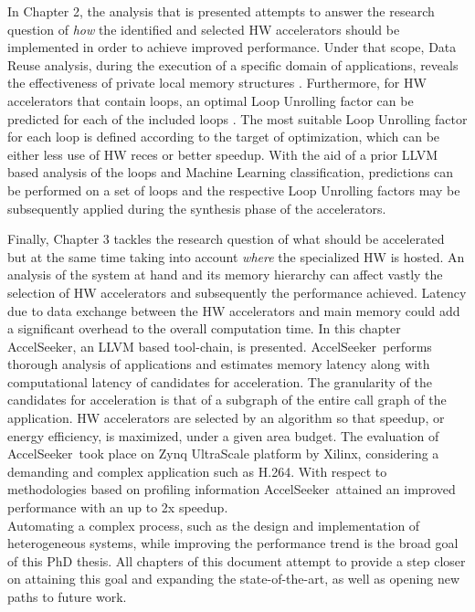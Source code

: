 \documentclass[]{usiinfthesis}
\newcommand{\aseeker}{{AccelSeeker}}
\newcommand{\htsf}{{H.264}}
\newcommand{\SoTA}{{state-of-the-art}}
\begin{document}
In Chapter 2, the 
analysis that is presented attempts to answer the research question of {\em how} the identified and 
selected HW accelerators should be implemented in order to achieve improved performance. 
Under that scope, Data Reuse analysis, during the execution of a specific domain of applications, 
reveals the effectiveness of private local memory structures \cite{ZacharopoulosJan17}. 
Furthermore, for HW accelerators that contain loops, an optimal
Loop Unrolling factor can be predicted for each of the included loops \cite{ZacharopoulosJul18}. 
The most suitable Loop Unrolling factor
for each loop is defined according to the target of optimization, which can be either less use of HW
 reces or better speedup. With the aid of a prior LLVM based analysis 
 of the loops and Machine Learning classification, predictions can be performed on a set of loops and the respective 
Loop Unrolling factors may be subsequently applied during the synthesis phase of the accelerators. \par

Finally, Chapter 3 tackles the research question of what should be accelerated but at the same time
taking into account {\em where} the specialized HW is hosted.
An analysis of the system at hand and its memory hierarchy can affect vastly the selection
of HW accelerators and subsequently the performance achieved. Latency due to data exchange
between the HW accelerators and main memory could add a significant overhead to the overall 
computation time. In this chapter \aseeker, an LLVM based tool-chain, is presented. \aseeker\ 
performs thorough analysis of applications
and estimates memory latency along with computational latency of candidates for acceleration. The 
granularity of the candidates for acceleration is that of a subgraph of the entire call graph of 
the application. 
HW accelerators are selected by an algorithm so that speedup, or energy efficiency, is maximized, 
under a given area budget. The evaluation 
of \aseeker\ took place on Zynq UltraScale platform by Xilinx, considering a demanding and complex 
application such as \htsf. With respect to methodologies based on profiling information \aseeker\ 
attained an improved performance with an up to 2x speedup.\\
Automating a complex process, such as the design and implementation of heterogeneous systems, while
improving the performance trend is the broad goal of this PhD thesis. All chapters of this document 
attempt to provide a step closer on attaining this goal and expanding the \SoTA, as well as opening 
new paths to future work.
\end{document}
